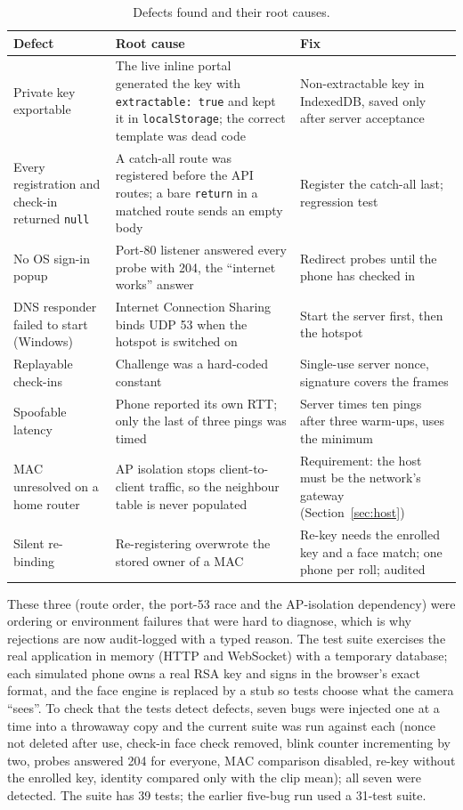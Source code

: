 \documentclass[11pt,a4paper]{article}
\newcommand{\code}[1]{\texttt{#1}}
\begin{document}
\begin{table}[t]
\centering
\small
\begin{tabular}{@{}p{3.6cm}p{4.9cm}p{5.4cm}@{}}
\toprule
Defect & Root cause & Fix \\
\midrule
Private key exportable & The live inline portal generated the key with \code{extractable: true} and kept it in \code{localStorage}; the correct template was dead code & Non-extractable key in IndexedDB, saved only after server acceptance \\
\addlinespace
Every registration and check-in returned \code{null} & A catch-all route was registered before the API routes; a bare \code{return} in a matched route sends an empty body & Register the catch-all last; regression test \\
\addlinespace
No OS sign-in popup & Port-80 listener answered every probe with 204, the ``internet works'' answer & Redirect probes until the phone has checked in \\
\addlinespace
DNS responder failed to start (Windows) & Internet Connection Sharing binds UDP 53 when the hotspot is switched on & Start the server first, then the hotspot \\
\addlinespace
Replayable check-ins & Challenge was a hard-coded constant & Single-use server nonce, signature covers the frames \\
\addlinespace
Spoofable latency & Phone reported its own RTT; only the last of three pings was timed & Server times ten pings after three warm-ups, uses the minimum \\
\addlinespace
MAC unresolved on a home router & AP isolation stops client-to-client traffic, so the neighbour table is never populated & Requirement: the host must be the network's gateway (Section~\ref{sec:host}) \\
\addlinespace
Silent re-binding & Re-registering overwrote the stored owner of a MAC & Re-key needs the enrolled key and a face match; one phone per roll; audited \\
\bottomrule
\end{tabular}
\caption{Defects found and their root causes.}
\label{tab:defects}
\end{table}

These three (route order, the port-53 race and the AP-isolation dependency) were ordering or environment failures that were hard to diagnose, which is why rejections are now audit-logged with a typed reason. The test suite exercises the real application in memory (HTTP and WebSocket) with a temporary database; each simulated phone owns a real RSA key and signs in the browser's exact format, and the face engine is replaced by a stub so tests choose what the camera ``sees''. To check that the tests detect defects, seven bugs were injected one at a time into a throwaway copy and the current suite was run against each (nonce not deleted after use, check-in face check removed, blink counter incrementing by two, probes answered 204 for everyone, MAC comparison disabled, re-key without the enrolled key, identity compared only with the clip mean); all seven were detected. The suite has 39 tests; the earlier five-bug run used a 31-test suite.
\end{document}
